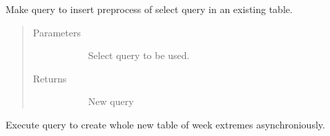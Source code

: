 \documentclass[letterpaper,10pt,english]{sphinxmanual}
\begin{document}
\begin{fulllineitems}
\label{\detokenize{autoapi/src/utils/snowflake/index:src.utils.snowflake.insert_table_query}}
Make query to insert preprocess of select query in an existing table.
\begin{quote}\begin{description}
\item[{Parameters}] \leavevmode\begin{description}
\item[{}] \leavevmode{[}\sphinxhref{https://docs.python.org/3/library/stdtypes.html\#str}{\sphinxcode{\sphinxupquote{str}}}{]}
Select query to be used.

\end{description}

\item[{Returns}] \leavevmode\begin{description}
\item[{}] \leavevmode
New query

\end{description}

\end{description}\end{quote}

\end{fulllineitems}


\begin{fulllineitems}
\label{\detokenize{autoapi/src/utils/snowflake/index:src.utils.snowflake.create_week_extremes}}
Execute query to create whole new table of week extremes asynchroniously.

\end{fulllineitems}

\end{document}
